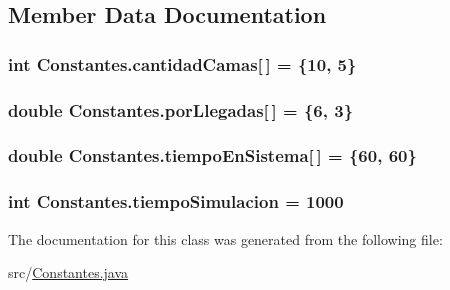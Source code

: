 \subsection{Member Data Documentation}
\hypertarget{class_constantes_a35a4f31608538e7fb1f8abd5b87a7283}{
\subsubsection[{cantidad\-Camas}]{\setlength{\rightskip}{0pt plus 5cm}int Constantes.\-cantidad\-Camas\mbox{[}$\,$\mbox{]} = \{10, 5\}\hspace{0.3cm}{\ttfamily [static]}}}\label{class_constantes_a35a4f31608538e7fb1f8abd5b87a7283}
\hypertarget{class_constantes_ad4ce9feb08ed227a1201268871807af9}{
\subsubsection[{por\-Llegadas}]{\setlength{\rightskip}{0pt plus 5cm}double Constantes.\-por\-Llegadas\mbox{[}$\,$\mbox{]} = \{6, 3\}\hspace{0.3cm}{\ttfamily [static]}}}\label{class_constantes_ad4ce9feb08ed227a1201268871807af9}
\hypertarget{class_constantes_a164c02deb45777f1aca1dc62882ec3fd}{
\subsubsection[{tiempo\-En\-Sistema}]{\setlength{\rightskip}{0pt plus 5cm}double Constantes.\-tiempo\-En\-Sistema\mbox{[}$\,$\mbox{]} = \{60, 60\}\hspace{0.3cm}{\ttfamily [static]}}}\label{class_constantes_a164c02deb45777f1aca1dc62882ec3fd}
\hypertarget{class_constantes_a7bef9819ff56fcd18505f64f06fee8ed}{
\subsubsection[{tiempo\-Simulacion}]{\setlength{\rightskip}{0pt plus 5cm}int Constantes.\-tiempo\-Simulacion = 1000\hspace{0.3cm}{\ttfamily [static]}}}\label{class_constantes_a7bef9819ff56fcd18505f64f06fee8ed}


The documentation for this class was generated from the following file\-:\begin{DoxyCompactItemize}
\item 
src/\hyperlink{_constantes_8java}{Constantes.\-java}\end{DoxyCompactItemize}
